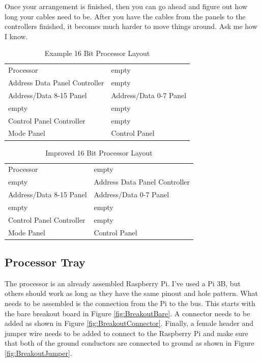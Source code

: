 \documentclass[10pt, openany]{book}
\begin{document}
Once your arrangement is finished, then you can go ahead and figure out how long your cables need to be.  After you have the cables from the panels to the controllers finished, it becomes much harder to move things around.  Ask me how I know.

\begin{table}
  \caption{Example 16 Bit Processor Layout}
  \label{tbl:Basic}
  \centering
  \begin{tabular}{|l|l|}
    \hline
    Processor & empty\\
    Address Data Panel Controller & empty\\
    Address/Data 8-15 Panel & Address/Data 0-7 Panel\\
    \hline
    empty & empty\\
    Control Panel Controller & empty\\
    Mode Panel & Control Panel\\
    \hline
  \end{tabular}
\end{table}

\begin{table}
  \caption{Improved 16 Bit Processor Layout}
  \label{tbl:Improved}
  \centering
  \begin{tabular}{|l|l|}
    \hline
    Processor & empty\\
    empty & Address Data Panel Controller\\
    Address/Data 8-15 Panel & Address/Data 0-7 Panel\\
    \hline
    empty & empty\\
    Control Panel Controller & empty\\
    Mode Panel & Control Panel\\
    \hline
  \end{tabular}
\end{table}

\subsection{Processor Tray}
The processor is an already assembled Raspberry Pi.  I've used a Pi 3B, but others should work as long as they have the same pinout and hole pattern.  What needs to be assembled is the connection from the Pi to the bus.  This starts with the bare breakout board in Figure \ref{fig:BreakoutBare}.  A connector needs to be added as shown in Figure \ref{fig:BreakoutConnector}.  Finally, a female header and jumper wire needs to be added to connect to the Raspberry Pi and make sure that both of the ground conductors are connected to ground as shown in Figure \ref{fig:BreakoutJumper}.
\end{document}
